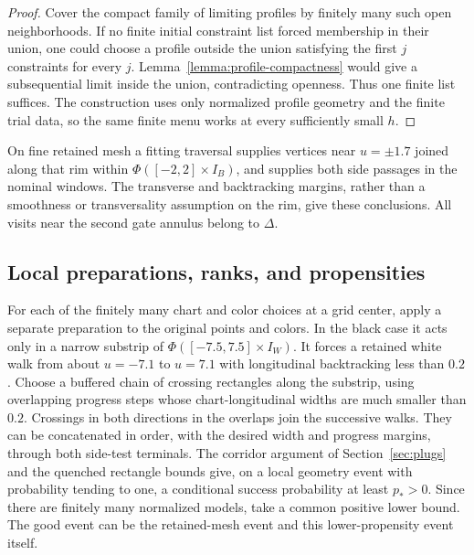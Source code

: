 \begin{proof}
Cover the compact family of limiting profiles by finitely many such
open neighborhoods.  If no finite initial constraint list forced
membership in their union, one could choose a profile outside the
union satisfying the first $j$ constraints for every $j$.
Lemma~\ref{lemma:profile-compactness} would give a subsequential limit
inside the union, contradicting openness.  Thus one finite list
suffices.  The construction uses only normalized profile geometry and
the finite trial data, so the same finite menu works at every
sufficiently small $h$.
\end{proof}

On fine retained mesh a fitting traversal supplies vertices near
$u=\pm1.7$ joined along that rim within
$\Phi([-2,2]\times I_B)$, and supplies both side passages in the
nominal windows.  The transverse and backtracking margins, rather than
a smoothness or transversality assumption on the rim, give these
conclusions.  All visits near the second gate annulus belong to
$\Delta$.

\subsection{Local preparations, ranks, and propensities}

For each of the finitely many chart and color choices at a grid center,
apply a separate preparation to the original points and colors.  In
the black case it acts only in a narrow substrip of
$\Phi([-7.5,7.5]\times I_W)$.  It forces a retained white walk from
about $u=-7.1$ to $u=7.1$ with longitudinal backtracking less than $0.2$.
Choose a buffered chain of crossing rectangles along the substrip,
using overlapping progress steps whose chart-longitudinal widths are
much smaller than $0.2$.  Crossings in both directions in the overlaps
join the successive walks.  They can be concatenated in order, with
the desired width and progress margins, through both side-test
terminals.  The corridor argument of Section~\ref{sec:plugs} and the
quenched rectangle bounds give, on a local geometry event with
probability tending to one, a conditional success probability at least
$p_*>0$.  Since there are finitely many normalized models, take a
common positive lower bound.  The good event can be the retained-mesh
event and this lower-propensity event itself.

